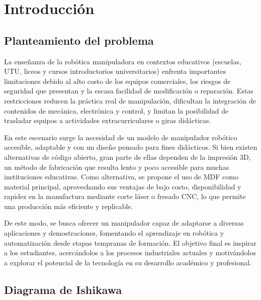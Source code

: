 \section{Introducción}
\subsection{Planteamiento del problema}

La enseñanza de la robótica manipuladora en contextos educativos (escuelas, UTU, liceos y cursos introductorios universitarios) enfrenta importantes limitaciones debido al alto costo de los equipos comerciales, los riesgos de seguridad que presentan y la escasa facilidad de modificación o reparación. Estas restricciones reducen la práctica real de manipulación, dificultan la integración de contenidos de mecánica, electrónica y control, y limitan la posibilidad de trasladar equipos a actividades extracurriculares o giras didácticas.

En este escenario surge la necesidad de un modelo de manipulador robótico accesible, adaptable y con un diseño pensado para fines didácticos. Si bien existen alternativas de código abierto, gran parte de ellas dependen de la impresión 3D, un método de fabricación que resulta lento y poco accesible para muchas instituciones educativas. Como alternativa, se propone el uso de MDF como material principal, aprovechando sus ventajas de bajo costo, disponibilidad y rapidez en la manufactura mediante corte láser o fresado CNC, lo que permite una producción más eficiente y replicable.

De este modo, se busca ofrecer un manipulador capaz de adaptarse a diversas aplicaciones y demostraciones, fomentando el aprendizaje en robótica y automatización desde etapas tempranas de formación. El objetivo final es inspirar a los estudiantes, acercándolos a los procesos industriales actuales y motivándolos a explorar el potencial de la tecnología en su desarrollo académico y profesional.

\subsection{Diagrama de Ishikawa}

\vspace{1em}


